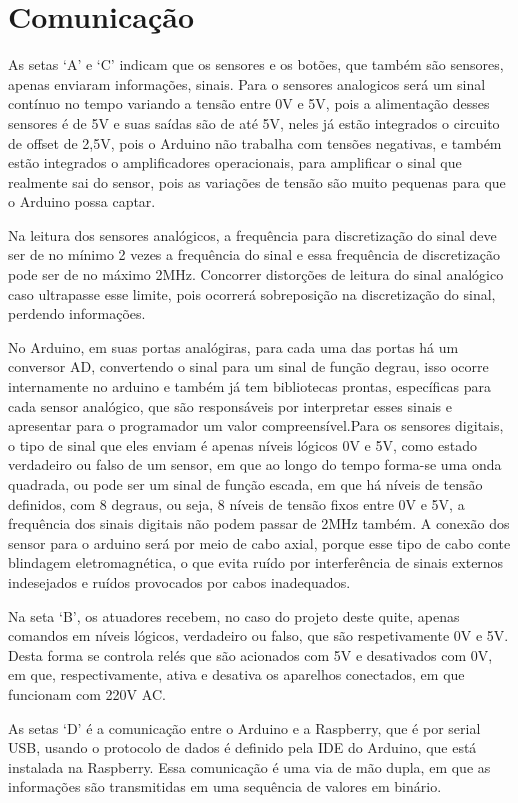 \section{Comunicação}
\par As setas ‘A’ e ‘C’ indicam que os sensores e os botões, que também são sensores, apenas enviaram informações, sinais. Para o sensores analogicos será um sinal contínuo no tempo variando a tensão entre 0V e 5V, pois a alimentação desses sensores é de 5V e suas saídas são de até 5V, neles já estão integrados o circuito de offset de 2,5V, pois o Arduino não trabalha com tensões negativas, e também estão integrados o amplificadores operacionais, para  amplificar o sinal que realmente sai do sensor, pois as variações de tensão são muito pequenas para que o Arduino possa captar.
\par Na leitura dos sensores analógicos, a frequência para discretização do sinal deve ser de no mínimo 2 vezes a frequência do sinal e essa frequência de discretização pode ser de no máximo 2MHz. Concorrer distorções de leitura do sinal analógico caso ultrapasse esse limite, pois ocorrerá sobreposição na discretização do sinal, perdendo informações.
\par No Arduino, em suas portas analógiras, para cada uma das portas há um conversor AD, convertendo o sinal para um sinal de função degrau, isso ocorre internamente no arduino e também já tem bibliotecas prontas, específicas para cada sensor analógico, que são responsáveis por interpretar esses sinais e apresentar para o programador um valor compreensível.Para os sensores digitais, o  tipo de sinal que eles enviam é apenas  níveis lógicos 0V e 5V, como estado verdadeiro ou falso de um sensor, em que ao longo do tempo forma-se uma onda quadrada, ou pode ser um sinal de função escada, em que há níveis de tensão definidos, com 8 degraus, ou seja, 8 níveis de tensão fixos entre 0V e 5V, a frequência dos sinais digitais não podem passar de 2MHz também. A conexão dos sensor para o arduino será por meio de cabo axial, porque esse tipo de cabo conte blindagem eletromagnética, o que evita ruído por interferência de sinais externos indesejados e ruídos provocados por cabos inadequados.
\par Na seta ‘B’, os atuadores recebem, no caso do projeto deste quite, apenas comandos em níveis lógicos, verdadeiro ou falso, que são respetivamente 0V e 5V. Desta forma se controla relés que são acionados com 5V e desativados com 0V, em que, respectivamente, ativa e desativa os aparelhos conectados, em que funcionam com 220V AC.
\par As setas ‘D’ é a comunicação entre o Arduino e a Raspberry, que é por serial USB, usando o protocolo de dados é definido pela IDE do Arduino, que está instalada na Raspberry. Essa comunicação é uma via de mão dupla, em que as informações são transmitidas em uma sequência de valores em binário.

